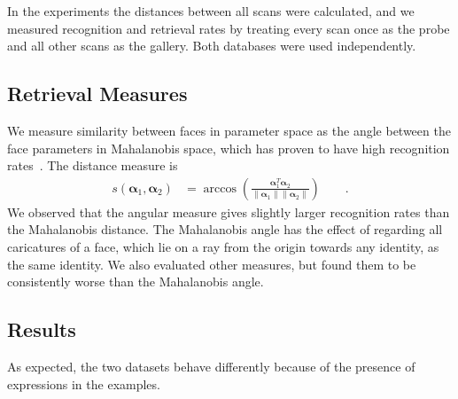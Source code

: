 \documentclass[10pt,twocolumn,letterpaper]{article}
\newcommand*{\VEC}[1]  {\ensuremath{\bm{#1}}}
\newcommand*{\norm}[1]{\mathopen\| #1 \mathclose\|}%
\begin{document}
In the experiments the distances between all scans were calculated, and we
measured recognition and retrieval rates by treating every scan once as the
probe and all other scans as the gallery. Both databases were used
independently.

\subsection{Retrieval Measures}
We measure similarity between faces in parameter space as the angle between the
face parameters in Mahalanobis space, which has proven to have high recognition
rates~\cite{blanz03:face_rec}. The distance measure is
\begin{align}
  s(\VEC\alpha_1, \VEC\alpha_2) &= \arccos\left(\frac{\VEC\alpha_1^T\VEC\alpha_2}{\norm{\VEC\alpha_1}\norm{\VEC\alpha_2}}\right)\qquad.
\end{align}
We observed that the angular measure gives slightly larger recognition rates
than the Mahalanobis distance. The Mahalanobis angle has the effect of
regarding all caricatures of a face, which lie on a ray from the origin towards
any identity, as the same identity. We also evaluated other measures, but found
them to be consistently worse than the Mahalanobis angle.

\subsection{Results}
As expected, the two datasets behave differently because of the presence of
expressions in the examples. 
\end{document}
